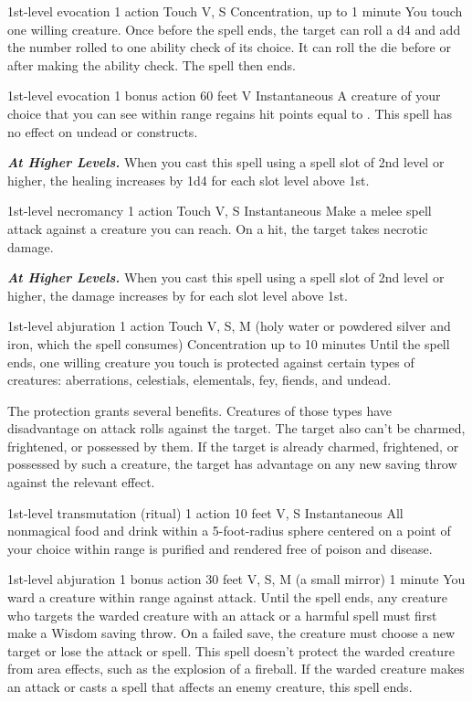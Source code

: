 \documentclass[10pt,twoside,twocolumn,openany]{book}
\newcommand{\castingModifier}{3}
\newcommand\impact[1]{
	\textbf{\textit{#1}}
}
\begin{document}
{1st-level evocation}
{\color{action} 1 action}
{Touch}
{V, S}
{{\color{concentration}Concentration}, up to 1 minute}
%
You touch one willing creature. Once before the spell ends, the target can roll a d4 and add the number rolled to one ability check of its choice. It can roll the die before or after making the ability check. The spell then ends.

{1st-level evocation}
{\color{bonusaction} 1 bonus action}
{60 feet}
{V}
{Instantaneous}
%
A creature of your choice that you can see within range regains hit points equal to \dice{1d4 + \castingModifier}. This spell has no effect on undead or constructs.

\impact{At Higher Levels.} When you cast this spell using a spell slot of 2nd level or higher, the healing increases by 1d4 for each slot level above 1st.

{1st-level necromancy}
{\color{action} 1 action}
{Touch}
{V, S}
{Instantaneous}
%
Make a melee spell attack against a creature you can reach. On a hit, the target takes  necrotic damage.

\impact{At Higher Levels.} When you cast this spell using a spell slot of 2nd level or higher, the damage increases by
 for each slot level above 1st.

{1st-level abjuration}
{\color{action} 1 action}
{Touch}
{V, S, M (holy water or powdered silver and iron, which the spell consumes)}
{{\color{concentration}Concentration} up to 10 minutes}
%
Until the spell ends, one willing creature you touch is protected against certain types of creatures: aberrations, celestials, elementals, fey, fiends, and undead.

The protection grants several benefits. Creatures of those types have disadvantage on attack rolls against the target. The target also can't be charmed, frightened, or possessed by them. If the target is already charmed, frightened, or possessed by such a creature, the target has advantage on any new saving throw against the relevant effect.

{1st-level transmutation {\color{ritual}(ritual)}}
{\color{action} 1 action}
{10 feet}
{V, S}
{Instantaneous}
%
All nonmagical food and drink within a 5-foot-radius sphere centered on a point of your choice within range is purified and rendered free of poison and disease.

{1st-level abjuration}
{\color{bonusaction}1 bonus action}
{30 feet}
{V, S, M (a small mirror)}
{1 minute}
%
You ward a creature within range against attack. Until the spell ends, any creature who targets the warded creature with an attack or a harmful spell must first make a Wisdom saving throw. On a failed save, the creature must choose a new target or lose the attack or spell. This spell doesn't protect the warded creature from area effects, such as the explosion of a fireball. If the warded creature makes an attack or casts a spell that affects an enemy creature, this spell ends.
\end{document}
